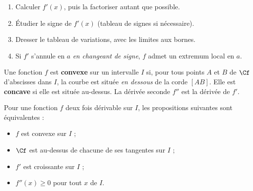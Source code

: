 \begin{savoirfaire}
\begin{enumerate}[label=\otLabel{\arabic*.},leftmargin=1.6em,itemsep=0.6mm,topsep=0.5mm]
  \item Calculer $f'(x)$, puis la factoriser autant que possible.
  \item Étudier le signe de $f'(x)$ (tableau de signes si nécessaire).
  \item Dresser le tableau de variations, avec les limites aux bornes.
  \item Si $f'$ s'annule en $a$ \emph{en changeant de signe}, $f$ admet un extremum local en $a$.
\end{enumerate}
\end{savoirfaire}


\begin{definition}
Une fonction $f$ est \textbf{convexe} sur un intervalle $I$ si, pour tous points $A$ et $B$ de $\Cf$ d'abscisses dans
$I$, la courbe est située \emph{en dessous} de la corde $[AB]$. Elle est \textbf{concave} si elle est située au-dessus.
La dérivée seconde $f''$ est la dérivée de $f'$.
\end{definition}

\begin{theoreme}
Pour une fonction $f$ deux fois dérivable sur $I$, les propositions suivantes sont équivalentes :
\begin{itemize}[label={\color{otNavy}\textbullet},leftmargin=1.4em,itemsep=0.4mm,topsep=0.8mm]
  \item $f$ est convexe sur $I$ ;
  \item $\Cf$ est au-dessus de chacune de ses tangentes sur $I$ ;
  \item $f'$ est croissante sur $I$ ;
  \item $f''(x)\geq0$ pour tout $x$ de $I$.
\end{itemize}
\end{theoreme}

